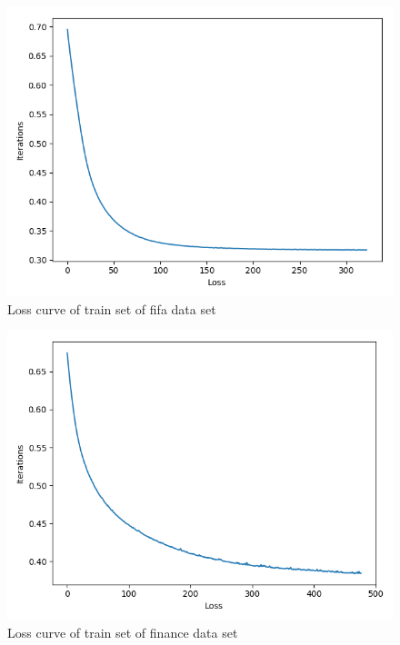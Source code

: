 \documentclass{article}
\begin{document}
\begin{figure}[h]
  \centering
  \includegraphics[scale=0.3]{loss_fifa.png}
  \caption{Loss curve of train set of fifa data set}
\end{figure}

\begin{figure}[h]
  \centering
  \includegraphics[scale=0.3]{loss_finance.png}
  \caption{Loss curve of train set of finance data set}
\end{figure}
\end{document}
